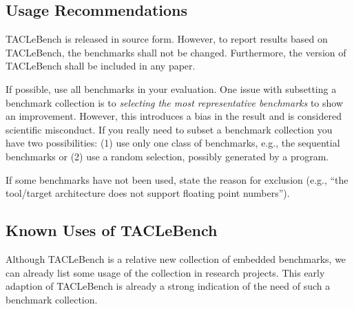 \documentclass[a4paper,UKenglish]{oasics}
\newcommand{\todo}[1]{{\emph{TODO: #1}}}
\newcommand{\martin}[1]{{\color{blue} Martin: #1}}
\renewcommand{\todo}[1]{}
\renewcommand{\martin}[1]{}
\begin{document}
\subsection{Usage Recommendations}
\label{usage}

TACLeBench is released in source form. However, to report
results based on TACLeBench, the benchmarks shall not be changed.
Furthermore, the version of TACLeBench shall be included in any paper.

If possible, use all benchmarks in your evaluation. One issue with subsetting
a benchmark collection is to \emph{selecting the most representative benchmarks}
to show an improvement. However, this introduces a bias in the result and
is considered scientific misconduct. If you really need to subset a benchmark collection you have
two possibilities: (1) use only one class of benchmarks, e.g., the sequential
benchmarks or (2) use a random selection, possibly generated by a program.

If some benchmarks have not been used, state the reason for exclusion
(e.g., ``the tool/target architecture does not support floating point numbers'').
\martin{I would really like to aim for a benchmark collection that does not
need any changes! Better drop some.}


\subsection{Known Uses of TACLeBench}

Although TACLeBench is a relative new collection of embedded benchmarks,
we can already list some usage of the collection in research projects.
This early adaption of TACLeBench is already a strong indication of
the need of such a benchmark collection.

\martin{This section might go away, as we have not enough pace.
However, it is good to collect the information here. We might need it
for a future journal version.}

\todo{Refs are missing form some usage.}
\end{document}
